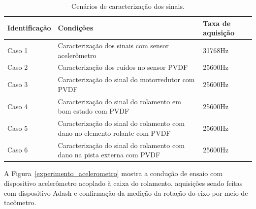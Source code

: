 \documentclass[
	12pt,				
	oneside,			
	a4paper,			
	english,			
	brazil,	
	sumario=abnt-6027-2012		
	]{abntex2ppgsi}
\begin{document}
\begin{table}[h]
\caption{Cenários de caracterização dos sinais.}
\begin{tabularx}{\textwidth}{|X|X|X|}
\hline
Identificação & Condições~                                                                                                                          & Taxa de aquisição  \\ 
\hline
Caso
1        & Caracterização dos sinais com sensor acelerômetro                                                                                                              & 31768Hz            \\ 
\hline
Caso 2        & Caracterização dos ruídos no sensor PVDF & 25600Hz            \\ 
\hline
Caso 3        & Caracterização do sinal do motorredutor com PVDF & 25600Hz            \\ 
\hline
Caso 4        & Caracterização do sinal do rolamento em bom estado com PVDF                                                                                              & 25600Hz            \\ 
\hline
Caso 5        & Caracterização do sinal do rolamento com dano no elemento rolante com PVDF                                                                               & 25600Hz            \\ 
\hline
Caso 6        & Caracterização do sinal do rolamento com dano na pista externa com PVDF                                                                               & 25600Hz            \\ 
\hline
\end{tabularx}
\label{tab:conjuntoDeTestes}
\end{table}

A Figura~\ref{experimento_acelerometro} mostra a condução de ensaio com dispositivo acelerômetro acoplado à caixa do rolamento, aquisições sendo feitas com dispositivo Adash e confirmação da medição da rotação do eixo por meio de tacômetro.
\end{document}
